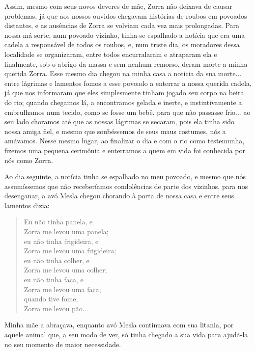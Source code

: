 Assim, mesmo com seus novos deveres de mãe, Zorra não deixava de causar problemas, já que aos nossos ouvidos chegavam histórias de roubos em povoados distantes, e as ausências de Zorra se volviam cada vez mais prolongadas.
Para nossa má sorte, num povoado vizinho, tinha-se espalhado a notícia que era uma cadela a responsável de todos os roubos, e, num triste dia, os moradores dessa localidade se organizaram, entre todos encurralaram e atraparam ela e finalmente, sob o abrigo da massa e sem nenhum remorso, deram morte a minha querida Zorra.
Esse mesmo dia chegou na minha casa a notícia da sua morte... entre lágrimas e lamentos fomos a esse povoado a enterrar a nossa querida cadela, já que nos informaram que eles simplesmente tinham jogado seu corpo na beira do rio; quando chegamos lá, a encontramos gelada e inerte, e instintivamente a embrulhamos num tecido, como se fosse um bebê, para que não passasse frio... ao seu lado choramos até que as nossas lágrimas se secaram, pois ela tinha sido nossa amiga fiel, e mesmo que soubéssemos de  seus maus costumes, nós a amávamos.
Nesse mesmo lugar, ao finalizar o dia e com o rio como testemunha, fizemos uma pequena cerimônia e enterramos a quem em vida foi conhecida por nós como Zorra. 

Ao dia seguinte, a notícia tinha se espalhado no meu povoado, e mesmo que nós assumíssemos que não receberíamos condolências de parte dos vizinhos, para nos desenganar, a avó Mesla chegou chorando à porta de nossa casa e entre seus lamentos dizia:
\begin{quotation}
\noindent Eu não tinha panela, e \\Zorra me levou uma panela;\\ 
eu não tinha frigideira, e \\Zorra me levou uma frigideira;\\ 
eu não tinha colher, e \\Zorra me levou uma colher;\\
eu não tinha faca, e \\Zorra me levou uma faca;\\
quando tive fome, \\Zorra me levou pão...  
\end{quotation}
Minha mãe a abraçava, enquanto avó Mesla continuava com sua litania, por aquele animal que, a seu modo de ver, só tinha chegado a sua vida para ajudá-la no seu momento de maior necessidade.
 

